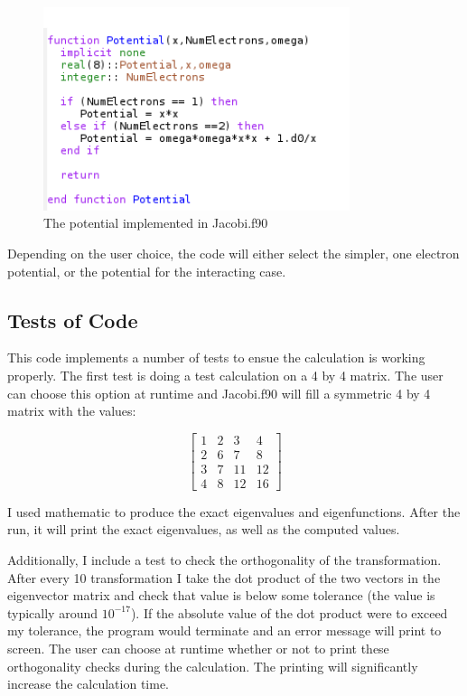 \documentclass[%
oneside,                 %
final,                   %
10pt]{article}
\begin{document}
\begin{figure}[H]\label{fig:Potential}
  \centering
    \includegraphics[width=0.8\textwidth]{Potential.PNG}
    \caption{The potential implemented in Jacobi.f90}
\end{figure}

Depending on the user choice, the code will either select the simpler, one electron potential, or the potential for the interacting case.

\subsection{Tests of Code}

This code implements a number of tests to ensue the calculation is working properly.  The first test is doing a test calculation on a 4 by 4 matrix.  The user can choose this option at runtime and Jacobi.f90  will fill a symmetric 4 by 4 matrix with the values:

\begin{equation}
 \begin{bmatrix} 1 & 2 & 3 & 4 \\
                           2 & 6 & 7 & 8 \\
		      3 & 7 & 11 & 12 \\
		     4 & 8 & 12 & 16
             \end{bmatrix}  
\end{equation}

I used mathematic to produce the exact eigenvalues and eigenfunctions.  After the run, it will print the exact eigenvalues, as well as the computed values.

Additionally, I include a test to check the orthogonality of the transformation.  After every 10 transformation I take the dot product of the two vectors in the eigenvector matrix and check that value is below some tolerance (the value is typically around $10^{-17}$).  If the absolute value of the dot product were to exceed my tolerance, the program would terminate and an error message will print to screen.  The user can choose at runtime whether or not to print these orthogonality checks during the calculation.  The printing will significantly increase the calculation time.
\end{document}

